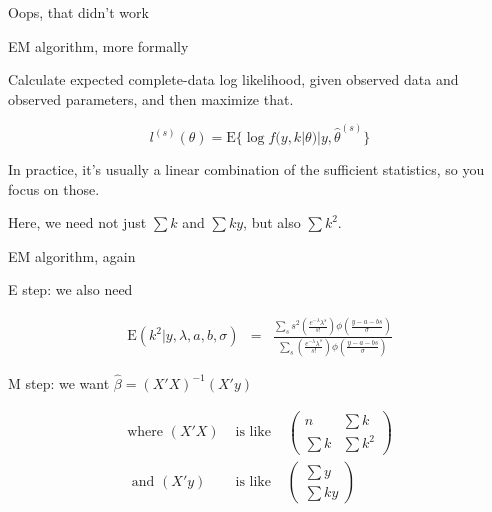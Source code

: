 \documentclass[aspectratio=169,12pt,t]{beamer}
\begin{document}
\begin{frame}{Oops, that didn't work}
\end{frame}




\begin{frame}{EM algorithm, more formally}

  \bbi

  \item Calculate expected complete-data log likelihood, given
    observed data and observed parameters, and then maximize that.

    $$ l^{(s)}(\theta) = \text{E}\{\log f(y, k | \theta) | y,
    \hat{\theta}^{(s)}\} $$

  \item In practice, it's usually a linear combination of the
    sufficient statistics, so you focus on those.

  \item Here, we need not just $\sum k$ and $\sum k y$, but also $\sum k^2$.

    \ei

\end{frame}

\begin{frame}{EM algorithm, again}

{\hilit E step}: we also need

\vspace{-4mm}

\begin{eqnarray*}
      \text{E}(k^2 | y, \lambda, a, b, \sigma)
      & = & \frac{\sum_s s^2 \left(\frac{e^{-\lambda}
          \lambda^s}{s!}\right)
        \phi\left(\frac{y-a-bs}{\sigma}\right)}{\sum_s
        \left(\frac{e^{-\lambda} \lambda^s}{s!}\right)
        \phi\left(\frac{y-a-bs}{\sigma}\right)}
\end{eqnarray*}

\vspace{5mm}

{\hilit M step}: we want $\hat{\beta} = (X'X)^{-1}(X'y)$

\begin{eqnarray*}
\text{where }  (X'X) & \text{ is like } &
  \begin{pmatrix} n & \sum k \\ \sum k & \sum k^2 \end{pmatrix}
  \\[18pt]
\text{ and }  (X'y) & \text{ is like } &
  \begin{pmatrix}\sum y \\ \sum k y \end{pmatrix}
\end{eqnarray*}



\end{frame}
\end{document}
